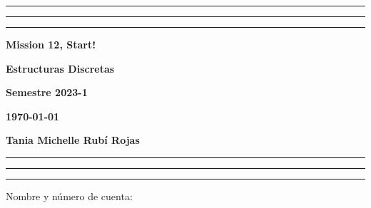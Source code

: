 \documentclass[12pt, a4paper]{exam}
\begin{document}
    \centering
    \hrule \hrule \hrule 
    \vspace{5mm}
    \begin{minipage}[c]{0.8\textwidth}
        \begin{center}
            {\large\textbf{Mission 12, Start!} \par
            \large \textbf{Estructuras Discretas} \par
            \large \textbf{Semestre 2023-1} \par
            \large \textbf{\today}	\par}
        \end{center}
    \end{minipage}

    \vspace{0.2in}
    \noindent
    \textbf{Tania Michelle Rubí Rojas}
    \vspace{2mm}
    \hrule \hrule \hrule 

    \vspace{5mm}
    \noindent
    Nombre y número de cuenta: \hrulefill\
\end{document}
